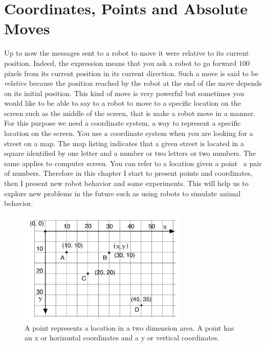\ifx\wholebook\relax\else



\fi

\chapter{Coordinates, Points and Absolute Moves}\label{ch:absoluteLocation}\label{cha:absoluteLocation}



Up to now the messages sent to a robot to move it were relative to its current position. Indeed, the expression  means that you ask a robot to go forward 100 pixels from its current position in its current direction. Such a move is said to be \emph{relative} because the position reached by the robot at the end of the move depends on its initial position. This kind of move is very powerful but sometimes you would like to be able to say to a robot to move to a specific location on the screen such as the middle of the screen, that is make a robot move in a  manner. For this purpose we need a coordinate system, \ie a way to represent a specific location on the screen. You use a coordinate system when you are looking for a street on a map. The map listing indicates that a given street is located in a square identified by one letter and a number or two letters or two numbers. The same applies to computer screen. You can refer to a location given a point \ie\ a pair of numbers. Therefore in this chapter I start to present points and coordinates, then I present new robot behavior and some experiments. This will help us to explore new problems in the future such as using robots to simulate animal behavior.

\begin{figure}
\begin{center}
\includegraphics[width=8cm]{PointsReperes}
\caption{A point represents a location in a two dimension area. A point has an x or horizontal coordinates and a y or vertical coordinates.\label{fig:PointsRepere}}
\end{center}
\end{figure}

